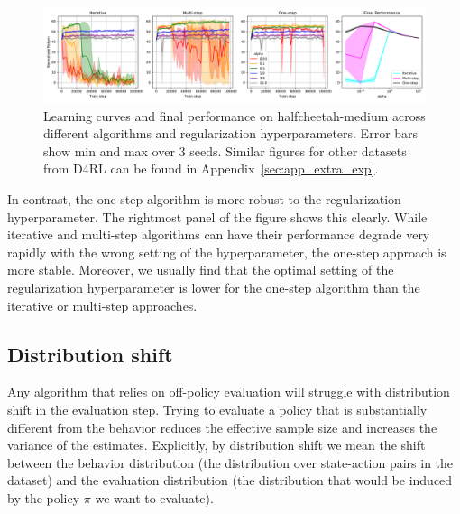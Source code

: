 \begin{figure}[h]
    \centering
    \includegraphics[width=\textwidth]{figures/offline-rl/learning curves/learning_curves.png}
    \caption{Learning curves and final performance on halfcheetah-medium across different algorithms and regularization hyperparameters. Error bars show min and max over 3 seeds. Similar figures for other datasets from D4RL can be found in Appendix~\ref{sec:app_extra_exp}.}
    \label{fig:learning_curves}
\end{figure}

In contrast, the one-step algorithm is more robust to the regularization hyperparameter. The rightmost panel of the figure shows this clearly. While iterative and multi-step algorithms can have their performance degrade very rapidly with the wrong setting of the hyperparameter, the one-step approach is more stable.
Moreover, we usually find that the optimal setting of the regularization hyperparameter is lower for the one-step algorithm than the iterative or multi-step approaches.







\subsection{Distribution shift}

Any algorithm that relies on off-policy evaluation will struggle with distribution shift in the evaluation step. Trying to evaluate a policy that is substantially different from the behavior reduces the effective sample size and increases the variance of the estimates. Explicitly, by distribution shift we mean the shift between the behavior distribution (the distribution over state-action pairs in the dataset) and the evaluation distribution (the distribution that would be induced by the policy $ \pi$ we want to evaluate).


